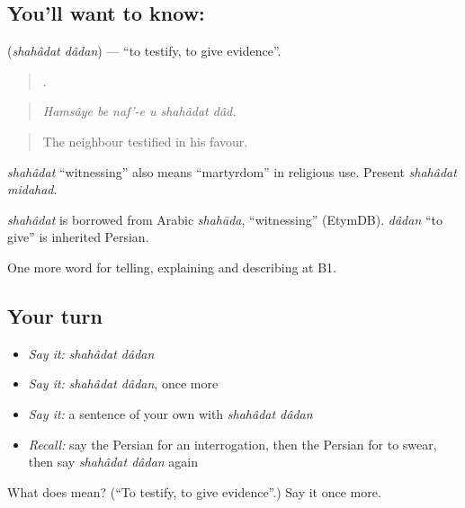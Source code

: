 \subsection*{You'll want to know:  }
\textbf{ } (\emph{shahâdat dâdan}) — \textquotedblleft{}to testify, to give evidence\textquotedblright{}.

\begin{quote}
     .
\end{quote}

\begin{quote}
\emph{Hamsâye be naf'-e u shahâdat dâd.}
\end{quote}

\begin{quote}
The neighbour testified in his favour.
\end{quote}

\emph{shahâdat} \textquotedblleft{}witnessing\textquotedblright{} also means \textquotedblleft{}martyrdom\textquotedblright{} in religious use. Present \emph{shahâdat midahad}.

\begin{cousinweb}
\emph{shahâdat} is borrowed from Arabic \emph{shahāda}, \textquotedblleft{}witnessing\textquotedblright{} (EtymDB). \emph{dâdan} \textquotedblleft{}to give\textquotedblright{} is inherited Persian.
\end{cousinweb}

\begin{grammarlens}[title={What you've built}]
One more word for telling, explaining and describing at B1.
\end{grammarlens}

\subsection*{Your turn}
\begin{itemize}
\raggedright
  \item \emph{Say it:} \emph{shahâdat dâdan}
  \item \emph{Say it:} \emph{shahâdat dâdan}, once more
  \item \emph{Say it:} a sentence of your own with \emph{shahâdat dâdan}
  \item \emph{Recall:} say the Persian for an interrogation, then the Persian for to swear, then say \emph{shahâdat dâdan} again
\end{itemize}

\begin{tcolorbox}[breakable,colback=teal!4,colframe=teal!35!black,title={Before you move on}]
What does   mean? (\textquotedblleft{}To testify, to give evidence\textquotedblright{}.) Say it once more.
\end{tcolorbox}
